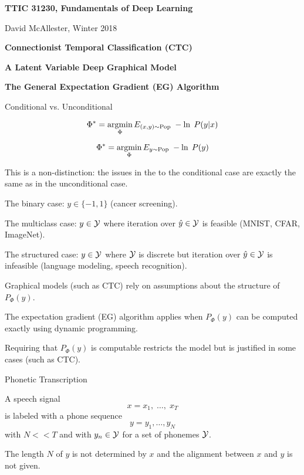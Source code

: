 





{\Huge

  \centerline{\bf TTIC 31230, Fundamentals of Deep Learning}
  \bigskip
  \centerline{David McAllester, Winter 2018}
  \vfill
  \vfill
  \centerline{\bf Connectionist Temporal Classification (CTC)}
  \vfill
  \centerline{\bf A Latent Variable Deep Graphical Model}
  \vfill
  \centerline{\bf The General Expectation Gradient (EG) Algorithm}
\vfill
{}

Conditional vs. Unconditional

\vfill
$$\Phi^* = \operatorname*{argmin}_\Phi E_{(x,y) \sim \mathrm{Pop}}\;-\ln \;P(y|x)$$

\vfill
$$\Phi^* = \operatorname*{argmin}_\Phi E_{y \sim \mathrm{Pop}}\;-\ln \;P(y)$$

\vfill
This is a non-distinction: the issues in the to the conditional case
are exactly the same as in the unconditional case.


The binary case: $y \in \{-1,1\}$ (cancer screening).

\vfill
The multiclass case: $y \in {\cal Y}$ where iteration over $\hat{y} \in {\cal Y}$ is feasible (MNIST, CFAR, ImageNet).

\vfill
{\color{red} The structured case: $y \in {\cal Y}$ where ${\cal Y}$ is discrete but iteration over $\hat{y} \in {\cal Y}$ is infeasible} (language modeling, speech recognition).


Graphical models (such as CTC) rely on assumptions about the structure of $P_\Phi(y)$.

\vfill
The {\color{red} expectation gradient (EG)} algorithm applies when $P_\Phi(y)$ can be computed exactly using dynamic programming.

\vfill
{\color{red} Requiring that $P_\Phi(y)$ is computable restricts the model but is justified in some cases (such as CTC).}

{Phonetic Transcription}

A speech signal
$$x = x_1,\; \ldots,\; x_T$$
is labeled with a phone sequence
$$y = y_1, \ldots, y_N$$
with $N << T$ and with $y_n \in {\cal Y}$ for a set of phonemes ${\cal Y}$.

\vfill
The length $N$ of $y$ is not determined by $x$ and the alignment between $x$ and $y$ is not given.

}
